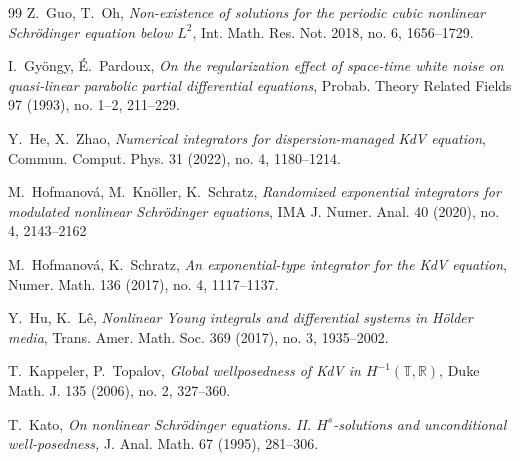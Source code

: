 \documentclass[letterpaper, 11pt,  reqno]{amsart}
\newcommand{\1}{\hspace{0.5mm}\text{I}\hspace{0.5mm}}
\newcommand{\R}{\mathbb{R}}
\newcommand{\T}{\mathbb{T}}
\numberwithin{equation}{section}
\numberwithin{theorem}{section}
\begin{document}
\begin{thebibliography}{99}
Z.~Guo,  T.~Oh, 
{\it Non-existence of solutions for the periodic cubic nonlinear Schr\"odinger equation below $L^2$}, Int. Math. Res. Not. 2018, no. 6, 1656--1729. 




I.~Gy\"ongy,  \'E.~Pardoux, 
    {\it On the regularization effect of space-time white noise on quasi-linear parabolic partial differential equations},
    Probab. Theory Related Fields 97 (1993), no. 1--2, 211--229.







Y.~He, X.~Zhao,
{\it Numerical integrators for dispersion-managed KdV equation}, 
Commun. Comput. Phys. 31 (2022), no. 4, 1180--1214. 





M.~Hofmanov\'a, M.~Kn\"oller, K.~Schratz,
{\it Randomized exponential integrators for modulated nonlinear Schr\"odinger equations}, IMA J. Numer. Anal. 40 (2020), no. 4, 2143--2162

M.~Hofmanov\'a,  K.~Schratz,
{\it An exponential-type integrator for the KdV equation},  Numer. Math. 136 (2017), no. 4, 1117--1137.


Y.~Hu, K.~L\^e, 
{\it Nonlinear Young integrals and differential systems in H\"older media},
 Trans. Amer. Math. Soc. 369 (2017), no. 3, 1935--2002. 


T.~Kappeler, P.~Topalov,
{\it Global wellposedness of KdV in $H^{-1}(\T, \R)$},
Duke Math. J. 135 (2006), no. 2, 327--360.




T.~Kato, {\it On nonlinear Schr\"odinger equations. II. $H^s$-solutions and unconditional
well-posedness,} J. Anal. Math. 67 (1995), 281--306.




%
%
%





\end{thebibliography}
\end{document}
